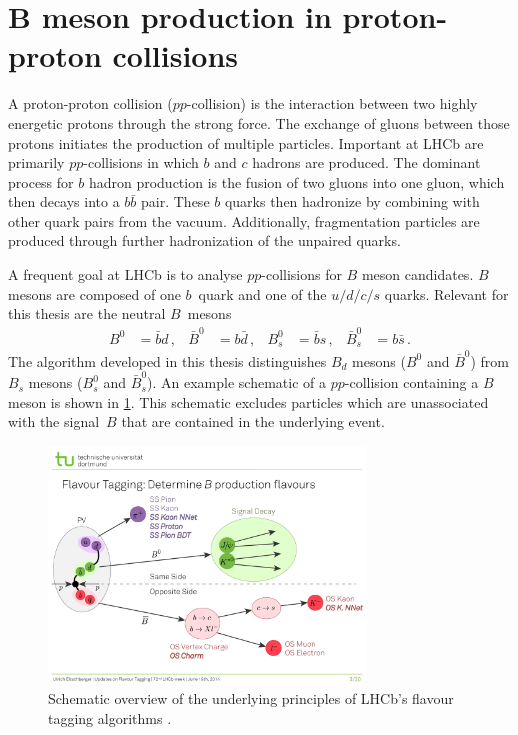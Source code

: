 \section[\texorpdfstring{$B$}{B} meson production in proton-proton collisions]{\texorpdfstring{$\symbf{B}$}{B} meson production in proton-proton collisions}
\label{sec:B_mesons}

A proton-proton collision ($pp$-collision) is the interaction between two highly energetic protons through the strong force.
The exchange of gluons between those protons initiates the production of multiple particles. 
Important at LHCb are primarily $pp$-collisions in which $b$ and $c$ hadrons are produced.
The dominant process for $b$ hadron production is the fusion of two gluons into one gluon, which then decays into a $b\bar{b}$ pair.
These $b$ quarks then hadronize by combining with other quark pairs from the vacuum. 
Additionally, fragmentation particles are produced through further hadronization of the unpaired quarks.

A frequent goal at LHCb is to analyse $pp$-collisions for $B$ meson candidates. %
$B$ mesons are composed of one $b$~quark and one of the $u/d/c/s$ quarks.
Relevant for this thesis are the neutral $B$~mesons
\begin{align*}
    B^0 &= \bar{b}d \, , & \bar{B}^0 &= b\bar{d} \, , & B_s^0 &= \bar{b}s \, , & \bar{B}_s^0 &= b\bar{s} \, .
\end{align*}
The algorithm developed in this thesis distinguishes $B_d$ mesons ($B^0$ and $\bar{B}^0$) from $B_s$ mesons ($B_s^0$ and $\bar{B}_s^0$).
An example schematic of a $pp$-collision containing a $B$ meson is shown in \cref{fig:ft_scheme}. 
This schematic excludes particles which are unassociated with the signal~$B$ that are contained in the underlying event.

\begin{figure}
    \centering
    \includegraphics[width=0.75\textwidth]{images/FlavourTaggingScheme.pdf}
    \caption{Schematic overview of the underlying principles of LHCb's flavour tagging algorithms \cite{ft_scheme}.}
    \label{fig:ft_scheme}
\end{figure}

